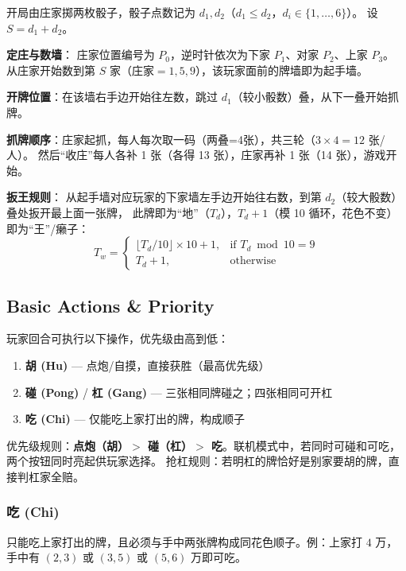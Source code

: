 \documentclass[11pt,a4paper]{article}
\begin{document}
开局由庄家掷两枚骰子，骰子点数记为 $d_1, d_2$（$d_1 \leq d_2$，$d_i \in \{1,\dots,6\}$）。
设 $S = d_1 + d_2$。

\textbf{定庄与数墙}：
庄家位置编号为 $P_0$，逆时针依次为下家 $P_1$、对家 $P_2$、上家 $P_3$。
从庄家开始数到第 $S$ 家（庄家$=1,5,9$），该玩家面前的牌墙即为起手墙。

\textbf{开牌位置}：在该墙右手边开始往左数，跳过 $d_1$（较小骰数）叠，从下一叠开始抓牌。

\textbf{抓牌顺序}：庄家起抓，每人每次取一码（两叠=4张），共三轮（$3 \times 4 = 12$ 张/人）。
然后``收庄''每人各补 1 张（各得 13 张），庄家再补 1 张（14 张），游戏开始。

\textbf{扳王规则}：
从起手墙对应玩家的下家墙左手边开始往右数，到第 $d_2$（较大骰数）叠处扳开最上面一张牌，
此牌即为``地''（$T_d$），$T_d + 1$（模 10 循环，花色不变）即为``王''/癞子：
\begin{equation}
  T_w = \begin{cases}
    \lfloor T_d/10 \rfloor \times 10 + 1, & \text{if } T_d \bmod 10 = 9 \\
    T_d + 1, & \text{otherwise}
  \end{cases}
\end{equation}

\subsection{Basic Actions \& Priority}

玩家回合可执行以下操作，优先级由高到低：

\begin{enumerate}[nosep,label=\textbf{\arabic*.}]
  \item \textbf{胡 (Hu)} — 点炮/自摸，直接获胜（最高优先级）
  \item \textbf{碰 (Pong)} / \textbf{杠 (Gang)} — 三张相同牌碰之；四张相同可开杠
  \item \textbf{吃 (Chi)} — 仅能吃上家打出的牌，构成顺子
\end{enumerate}

优先级规则：\textbf{点炮（胡）$>$ 碰（杠）$>$ 吃}。联机模式中，若同时可碰和可吃，两个按钮同时亮起供玩家选择。
抢杠规则：若明杠的牌恰好是别家要胡的牌，直接判杠家全赔。

\subsubsection*{吃 (Chi)}
只能吃上家打出的牌，且必须与手中两张牌构成同花色顺子。例：上家打 $4$ 万，手中有 $(2,3)$ 或 $(3,5)$ 或 $(5,6)$ 万即可吃。
\end{document}
